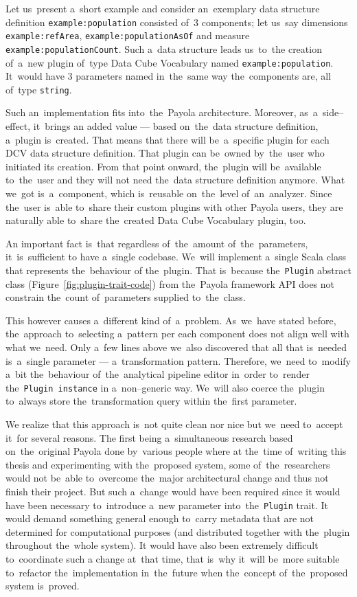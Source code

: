 \begin{sloppypar}
Let us~present a~short example and consider an~exemplary data structure definition \texttt{example:population}
consisted of~3 
components; let us~say dimensions \texttt{example:refArea}, \texttt{example:populationAsOf}
and measure \texttt{example:populationCount}. Such a~data structure leads us~to~the creation of~a~new plugin of~type Data Cube Vocabulary named 
\texttt{example:population}. It~would have 3 parameters named in~the~same way the~components are, all of~type \texttt{string}.
\end{sloppypar}

Such an~implementation fits into~the~Payola architecture. Moreover, as~a~side--effect, it~brings
an added value --- based on~the~data structure definition, a~plugin is~created. 
That means that there will be~a~specific plugin for each DCV data structure 
definition. That plugin can be~owned by~the~user who initiated its creation. 
From that point onward, the~plugin will be~available to~the~user and they
will not need the~data structure definition anymore. What we~got is~a~component, which is~reusable on~the~level of~an~analyzer. Since the~user is~able to~share their custom plugins with other Payola users, they are
naturally able to~share the~created Data Cube Vocabulary plugin, too. 

An important fact is~that regardless of~the~amount of~the~parameters, it~is~sufficient 
to have a~single codebase. We~will implement a~single Scala class that represents the~behaviour 
of the~plugin. That is~because the~\texttt{Plugin} abstract class (Figure~\ref{fig:plugin-trait-code})
from the~Payola framework
API does not constrain the~count of~parameters supplied to~the~class.

This however causes a~different kind of~a~problem. As~we~have stated before, the~approach to~selecting a~pattern per each component does not align well with what we~need. Only a~few lines above we~also discovered that all that is~needed is~a~single parameter --- a~transformation pattern. Therefore, we~need to~modify a~bit the~behaviour of~the~analytical pipeline editor in~order to~render the~\texttt{Plugin instance}
in a~non--generic way. We~will also coerce the~plugin to~always store the~transformation query 
within the~first parameter.

We realize that this approach is~not quite clean nor nice but we~need to~accept it~for several reasons.
The first being a~simultaneous research based on~the~original Payola done by~various people where
at the~time of~writing this thesis and experimenting with the~proposed system, some of~the~researchers 
would not be~able to~overcome the~major architectural change and thus not finish their project.
But such a~change would have been required since 
it would have been necessary to~introduce a~new parameter into~the~\texttt{Plugin} trait. 
It would demand something general enough to~carry metadata that are not determined for 
computational purposes (and distributed together with the~plugin throughout the~whole system).
It would have also been extremely difficult to~coordinate such 
a change at~that time, that is~why it~will be~more suitable to~refactor the~implementation in~the~future when the~concept of~the~proposed system is~proved.


